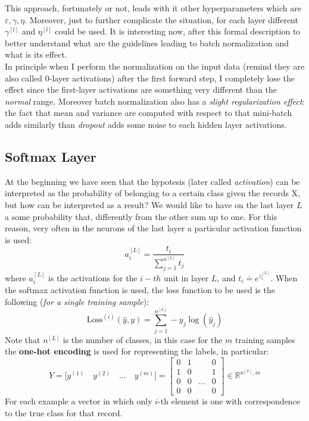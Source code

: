 This approach, fortunately or not, leads with it other hyperparameters which are $\varepsilon, \gamma, \eta$. Moreover, just to further complicate the situation, for each layer different $\gamma^{[l]}$ and $\eta^{[l]}$ could be used. It is interesting now, after this formal description to better understand what are the guidelines leading to batch normalization and what is its effect. \\
In principle when I perform the normalization on the input data (remind they are also called 0-layer activations) after the first forward step, I completely lose the effect since the first-layer activations are something very different than the \textit{normal} range. Moreover batch normalization also has a \textit{slight regularization effect}: the fact that mean and variance are computed with respect to that mini-batch adds similarly than \textit{dropout} adds some noise to each hidden layer activations. 

\subsection{Softmax Layer}
At the beginning we have seen that the hypotesis (later called \textit{activation}) can be interpreted as the probability of belonging to a certain class given the records X, but how can be interpreted as a result? We would like to have on the last layer $L$ a some probability that, differently from the other sum up to one. For this reason, very often in the neurons of the last layer a particular activation function is used: 
\begin{equation} \label{eq: Softmax}
    a_i^{[L]}=\frac{t_i}{\sum_{j=1}^{n^{[L]}}{t_j}}
\end{equation}
where $a_i^{[L]}$ is the activations for the $i-th$ unit in layer $L$, and $t_i\doteq{e^{z_{i}^{[L]}}}$. When the softmax activation function is used, the loss function to be used is the following (\textit{for a single training sample}): 
\begin{equation}\label{eq:loss_softmax}
    \text{Loss}^{(i)}(\hat{y}, y)=\sum_{j=1}^{n^{[L]}} -y_{j} \log(\hat{y}_j)
\end{equation}
Note that $n^{[L]}$ is the number of classes, in this case for the $m$ training samples the \textbf{one-hot encoding} is used for representing the labels, in particular:
\begin{equation}\label{eq: one_hot}
    Y=\big[
        y^{(1)} \quad y^{(2)} \quad ... \quad y^{(m)}
    \big] = \begin{bmatrix}
        0&1& &0\\
        1&0& &1\\
        0&0&...&0\\
        0&0& &0
    \end{bmatrix} \in \mathbb{R}^{n^{[L]}, m}
\end{equation}
For each example a vector in which only $i$-th element is one with correspondence to the true class for that record.

